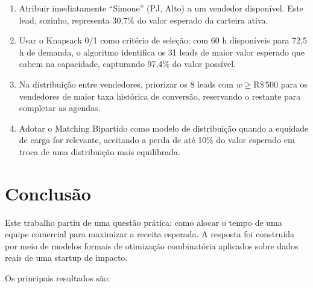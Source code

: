 \documentclass[12pt,a4paper]{article}
\begin{document}
\begin{enumerate}[label=\arabic*.]
  \item Atribuir imediatamente ``Simone'' (PJ, Alto) a um vendedor dispon\'{i}vel.
        Este lead, sozinho, representa 30,7\% do valor esperado da carteira ativa.
  \item Usar o Knapsack 0/1 como crit\'{e}rio de sele\c{c}\~{a}o: com 60 h dispon\'{i}veis
        para 72,5 h de demanda, o algoritmo identifica os 31 leads de maior valor
        esperado que cabem na capacidade, capturando 97,4\% do valor poss\'{i}vel.
  \item Na distribui\c{c}\~{a}o entre vendedores, priorizar os 8 leads com $w \geq
        \text{R\$}\,500$ para os vendedores de maior taxa hist\'{o}rica de convers\~{a}o,
        reservando o restante para completar as agendas.
  \item Adotar o Matching Bipartido como modelo de distribui\c{c}\~{a}o quando a
        equidade de carga for relevante, aceitando a perda de at\'{e} 10\% do
        valor esperado em troca de uma distribui\c{c}\~{a}o mais equilibrada.
\end{enumerate}

\section{Conclus\~{a}o}

Este trabalho partiu de uma quest\~{a}o pr\'{a}tica: como alocar o tempo de uma equipe
comercial para maximizar a receita esperada. A resposta foi constru\'{i}da por meio
de modelos formais de otimiza\c{c}\~{a}o combinat\'{o}ria aplicados sobre dados reais de
uma startup de impacto.

Os principais resultados s\~{a}o:
\end{document}
